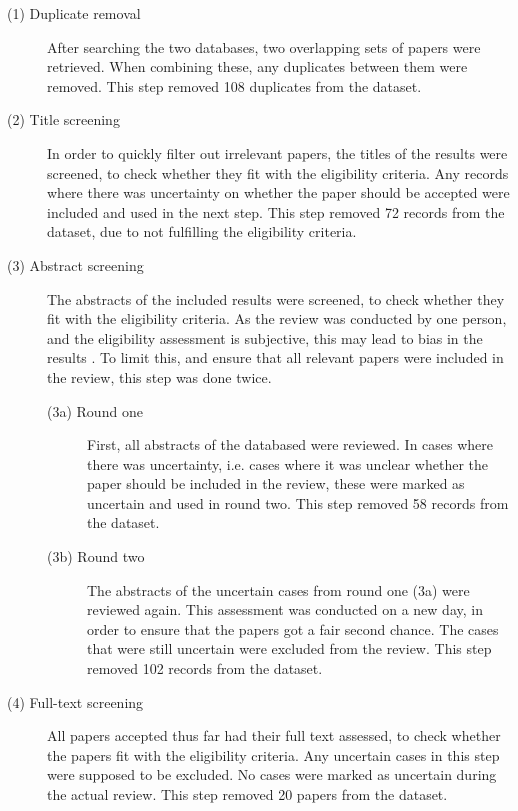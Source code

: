 \begin{description}    
    \item[\textnormal{(1)} Duplicate removal] After searching the two databases, two overlapping sets of papers were retrieved. When combining these, any duplicates between them were removed. This step removed 108 duplicates from the dataset.
    
    \item[\textnormal{(2)} Title screening] In order to quickly filter out irrelevant papers, the titles of the results were screened, to check whether they fit with the eligibility criteria. Any records where there was uncertainty on whether the paper should be accepted were included and used in the next step. This step removed 72 records from the dataset, due to not fulfilling the eligibility criteria.
    
    \item[\textnormal{(3)} Abstract screening] The abstracts of the included results were screened, to check whether they fit with the eligibility criteria. As the review was conducted by one person, and the eligibility assessment is subjective, this may lead to bias in the results \parencite{Tranfield_2003}. To limit this, and ensure that all relevant papers were included in the review, this step was done twice.
    \begin{description}
        \item[\textnormal{(3a)} Round one] First, all abstracts of the databased were reviewed. In cases where there was uncertainty, i.e. cases where it was unclear whether the paper should be included in the review, these were marked as uncertain and used in round two. This step removed 58 records from the dataset.
        
        \item[\textnormal{(3b)} Round two] The abstracts of the uncertain cases from round one (3a) were reviewed again. This assessment was conducted on a new day, in order to ensure that the papers got a fair second chance. The cases that were still uncertain were excluded from the review. This step removed 102 records from the dataset.
    \end{description}
    
    \item[\textnormal{(4)} Full-text screening] All papers accepted thus far had their full text assessed, to check whether the papers fit with the eligibility criteria. Any uncertain cases in this step were supposed to be excluded. No cases were marked as uncertain during the actual review. This step removed 20 papers from the dataset.
    

\end{description}
